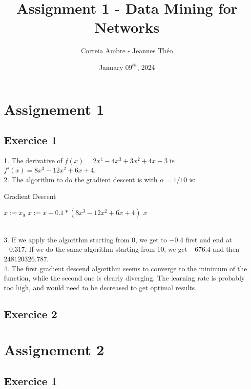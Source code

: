 \documentclass{article}
\title{Assignment 1 - Data Mining for Networks}
\author{Correia Ambre - Jeannes Théo}
\date{January $09^{th}$, 2024}
\begin{document}
    \maketitle


    \section{Assignement 1}

    \subsection{Exercice 1}
    1. The derivative of $f(x) = 2x^4 - 4x^3 + 3x^2 + 4x - 3$ is $f'(x) = 8x^3 - 12x^2 + 6x + 4$. \\
    2. The algorithm to do the gradient descent is with $\alpha = 1/10$ is:\\
    \begin{algorithm}
        \caption{Gradient Descent}\label{alg:algorithm}
        \begin{algorithmic}
            \STATE $x := x_0$
            \STATE $x := x - 0.1 * (8x^3 - 12x^2 + 6x + 4)$
            \ENDWHILE
            \RETURN $x$
        \end{algorithmic}
    \end{algorithm} \\
    3. If we apply the algorithm starting from 0, we get to $-0.4$ first and end at $-0.317$. If we do the same algorithm starting from 10, we get $-676.4$ and then $248120326.787$. \\
    4. The first gradient descend algorithm seems to converge to the minimum of the function, while the second one is clearly diverging. The learning rate is probably too high, and would need to be decreased to get optimal results.

    \subsection{Exercice 2}


    \section{Assignement 2}

    \subsection{Exercice 1}
\end{document}
